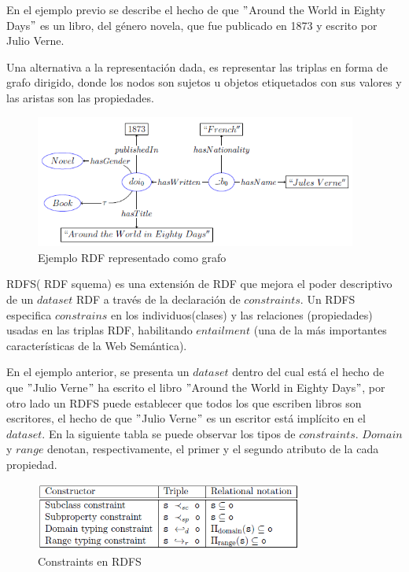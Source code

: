 \documentclass[10pt,a4paper]{article}
\begin{document}
En el ejemplo previo se describe el hecho de que $"$Around the World in Eighty Days$"$ es un libro, del género novela, que fue publicado en 1873 y escrito por Julio Verne.

Una alternativa a la representación dada, es representar las triplas en forma de grafo dirigido, donde los nodos son sujetos u objetos etiquetados con sus valores y las aristas son las propiedades.
\\
\begin{figure}[h]
\begin{center}
\includegraphics[width=300pt]{imgs/ejemplo_rdfgrafo}
\caption{Ejemplo RDF representado como grafo}
\end{center}
\end{figure}


RDFS( RDF squema) es una extensión de RDF que mejora el poder descriptivo de un $dataset$ RDF a través de la declaración de $constraints$. Un RDFS especifica $constrains$ en los individuos(clases) y las relaciones (propiedades) usadas en las triplas RDF, habilitando $entailment$ (una de la más importantes características de la Web Semántica). 

En el ejemplo anterior, se presenta un $dataset$ dentro del cual está el hecho de que $"$Julio Verne$"$ ha escrito el libro $"$Around the World in Eighty Days$"$, por otro lado un RDFS puede establecer que todos los que escriben libros son escritores, el hecho de que $"$Julio Verne$"$ es un escritor está implícito en el $dataset$.
\newpage
En la siguiente tabla se puede observar los tipos de $constraints$. $Domain$ y $range$ denotan, respectivamente, el primer y el segundo atributo de la cada propiedad.

\begin{figure}[h]
\begin{center}
\includegraphics[width=250pt]{imgs/constraints}
\caption{Constraints en RDFS}
\end{center}
\end{figure}
\end{document}
